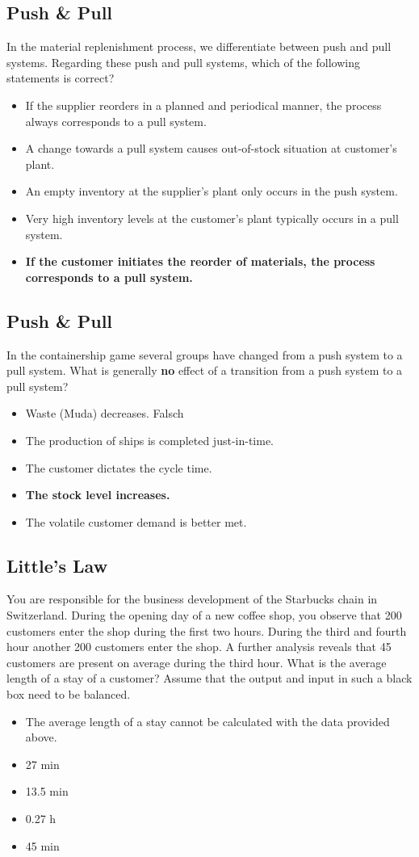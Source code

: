 \subsection{Push \& Pull}
In the material replenishment process, we differentiate between push and pull systems. Regarding these push and pull systems, which of the following statements is correct?
\begin{itemize}
\item If the supplier reorders in a planned and periodical manner, the process always corresponds to a pull system. 
\item A change towards a pull system causes out-of-stock situation at customer's plant. 
\item An empty inventory at the supplier's plant only occurs in the push system. 
\item Very high inventory levels at the customer's plant typically occurs in a pull system. 
\item\textbf{ If the customer initiates the reorder of materials, the process corresponds to a pull system.}
\end{itemize}
\subsection{Push \& Pull}
In the containership game several groups have changed from a push system to a pull system. What is generally \textbf{no} effect of a transition from a push system to a pull system?

\begin{itemize}
	\item Waste (Muda) decreases. Falsch
	\item The production of ships is completed just-in-time.
	\item The customer dictates the cycle time.
	\item\textbf{ The stock level increases.}
	\item The volatile customer demand is better met.
\end{itemize}
\subsection{Little's Law}
You are responsible for the business development of the Starbucks chain in Switzerland. During the opening day of a new coffee shop, you observe that 200 customers enter the shop during the first two hours. During the third and fourth hour another 200 customers enter the shop. A further analysis reveals that 45 customers are present on average during the third hour. What is the average length of a stay of a customer? Assume that the output and input in such a black box need to be balanced. 
\begin{itemize}
\item The average length of a stay cannot be calculated with the data provided above.  
\item 27 min
\item  13.5 min
\item  0.27 h
\item  45 min
\end{itemize}
